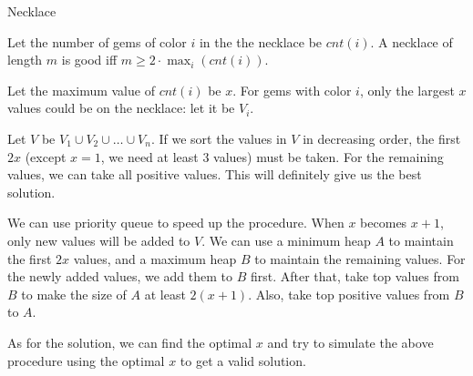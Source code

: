 \begin{tutorial}{Necklace}

Let the number of gems of color $i$ in the the necklace be $\mathit{cnt}(i)$. A necklace of length $m$ is good iff $m \ge 2 \cdot \max_i(\mathit{cnt}(i))$.

Let the maximum value of $\mathit{cnt}(i)$ be $x$. For gems with color $i$, only the largest $x$ values could be on the necklace: let it be $V_i$. 

Let $V$ be $V_1 \cup V_2 \cup \ldots \cup V_n$. If we sort the values in $V$ in decreasing order, the first $2x$ (except $x=1$, we need at least $3$ values) must be taken. For the remaining values, we can take all positive values. This will definitely give us the best solution.

We can use priority queue to speed up the procedure. When $x$ becomes $x+1$, only new values will be added to $V$. We can use a minimum heap $A$ to maintain the first $2x$ values, and a maximum heap $B$ to maintain the remaining values. For the newly added values, we add them to $B$ first. After that, take top values from $B$ to make the size of $A$ at least $2(x+1)$. Also, take top positive values from $B$ to $A$.

As for the solution, we can find the optimal $x$ and try to simulate the above procedure using the optimal $x$ to get a valid solution.

\end{tutorial}
